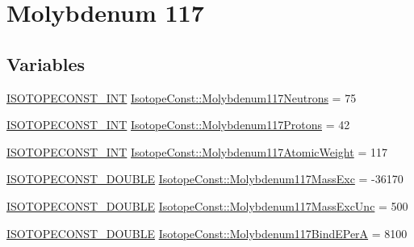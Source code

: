 \hypertarget{group___isotope_const-_molybdenum-_mo117}{}\section{Molybdenum 117}
\label{group___isotope_const-_molybdenum-_mo117}
\subsection*{Variables}
\begin{DoxyCompactItemize}
\item 
\mbox{\hyperlink{group___isotope_const-_macros_ga5f18360b3e99483a35c32d789e62621c}{I\+S\+O\+T\+O\+P\+E\+C\+O\+N\+S\+T\+\_\+\+I\+NT}} \mbox{\hyperlink{group___isotope_const-_molybdenum-_mo117_gacd31050476b7c8a6837675c0f8823356}{Isotope\+Const\+::\+Molybdenum117\+Neutrons}} = 75
\item 
\mbox{\hyperlink{group___isotope_const-_macros_ga5f18360b3e99483a35c32d789e62621c}{I\+S\+O\+T\+O\+P\+E\+C\+O\+N\+S\+T\+\_\+\+I\+NT}} \mbox{\hyperlink{group___isotope_const-_molybdenum-_mo117_ga4c466a2f6dbbb34e12d4c07dbd978480}{Isotope\+Const\+::\+Molybdenum117\+Protons}} = 42
\item 
\mbox{\hyperlink{group___isotope_const-_macros_ga5f18360b3e99483a35c32d789e62621c}{I\+S\+O\+T\+O\+P\+E\+C\+O\+N\+S\+T\+\_\+\+I\+NT}} \mbox{\hyperlink{group___isotope_const-_molybdenum-_mo117_gaa947ca4b5ad0a588ba99d9106dc3569c}{Isotope\+Const\+::\+Molybdenum117\+Atomic\+Weight}} = 117
\item 
\mbox{\hyperlink{group___isotope_const-_macros_ga8f45a7272ce02c0b4c65c44636ed719a}{I\+S\+O\+T\+O\+P\+E\+C\+O\+N\+S\+T\+\_\+\+D\+O\+U\+B\+LE}} \mbox{\hyperlink{group___isotope_const-_molybdenum-_mo117_ga109fd40fb8dd78185cf8e22801f52835}{Isotope\+Const\+::\+Molybdenum117\+Mass\+Exc}} = -\/36170
\item 
\mbox{\hyperlink{group___isotope_const-_macros_ga8f45a7272ce02c0b4c65c44636ed719a}{I\+S\+O\+T\+O\+P\+E\+C\+O\+N\+S\+T\+\_\+\+D\+O\+U\+B\+LE}} \mbox{\hyperlink{group___isotope_const-_molybdenum-_mo117_gada700bb3705a4bbd081fa62015bf48cb}{Isotope\+Const\+::\+Molybdenum117\+Mass\+Exc\+Unc}} = 500
\item 
\mbox{\hyperlink{group___isotope_const-_macros_ga8f45a7272ce02c0b4c65c44636ed719a}{I\+S\+O\+T\+O\+P\+E\+C\+O\+N\+S\+T\+\_\+\+D\+O\+U\+B\+LE}} \mbox{\hyperlink{group___isotope_const-_molybdenum-_mo117_ga964b63274d7a47ed44411023d170a6cf}{Isotope\+Const\+::\+Molybdenum117\+Bind\+E\+PerA}} = 8100
\item 

\end{DoxyCompactItemize}

